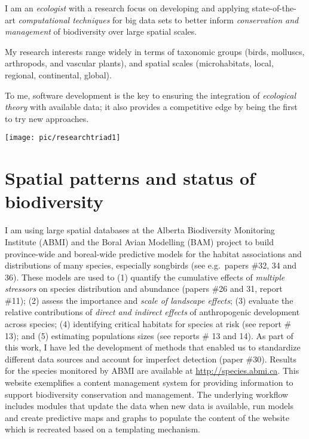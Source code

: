 \begin{multicols}{2}
I am an \emph{ecologist} with a research focus on developing and applying state-of-the-art \emph{computational techniques} for big data sets to better inform \emph{conservation and management} of biodiversity over large spatial scales.
\vspace{0.5pc}

My research interests range widely in terms of taxonomic groups (birds, molluscs, arthropods, and vascular plants), and spatial scales (microhabitats, local, regional, continental, global).
\vspace{0.5pc}

To me, software development is the key to ensuring the integration of \emph{ecological theory} with available data; it also provides a competitive edge by being the first to try new approaches. 
\vspace{0.5pc}

\columnbreak
\centering
\texttt{[image: pic/researchtriad1]}
\end{multicols}


\section{ Spatial patterns and status of biodiversity } %

I am using large spatial databases at the Alberta Biodiversity Monitoring Institute (ABMI) and the Boral Avian Modelling (BAM) project to build province-wide and boreal-wide predictive models for the habitat associations and distributions of many species, especially songbirds (see e.g.~papers \#32, 34 and 36). These models are used to (1) quantify the cumulative effects of \emph{multiple stressors} on species distribution and abundance (papers \#26 and 31, report \#11); (2) assess the importance and \emph{scale of landscape effects}; (3) evaluate the relative contributions of \emph{direct and indirect effects} of anthropogenic development across species; (4) identifying critical habitats for species at risk (see report \# 13); and (5) estimating populations sizes (see reports \# 13 and 14).
As part of this work, I have led the development of methods that enabled us to standardize different data sources and account for imperfect detection (paper \#30). Results for the species monitored by ABMI are available at \url{http://species.abmi.ca}. This website exemplifies a content management system for providing information to support biodiversity conservation and management. The underlying workflow includes modules that update the data when new data is available, run models and create predictive maps and graphs to populate the content of the website which is recreated based on a templating mechanism.
\vspace{0.5pc}

